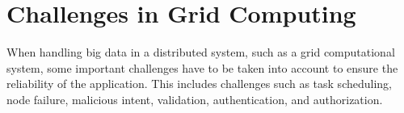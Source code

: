 \section{Challenges in Grid Computing}

When handling big data in a distributed system, such as a grid computational system, some important challenges have to be taken into account to ensure the reliability of the application. This includes challenges such as task scheduling, node failure, malicious intent, validation, authentication, and authorization.